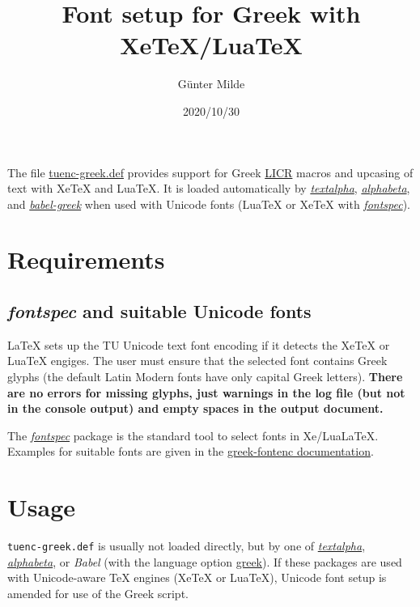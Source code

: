 \documentclass[a4paper]{article}
\begin{document}
\title{Font setup for Greek with XeTeX/LuaTeX}
\author{Günter Milde}
\date{2020/10/30}
\maketitle

\noindent The file \href{tuenc-greek.def.html}{tuenc-greek.def} provides
support for Greek \hyperref[licr]{LICR} macros and upcasing of text with
XeTeX and LuaTeX. It is loaded automatically by
\href{textalpha-doc.pdf}{\emph{textalpha}},
\href{alphabeta-doc.pdf}{\emph{alphabeta}}, and
\href{http://www.ctan.org/pkg/babel-greek}{\emph{babel-greek}} when used
with Unicode fonts (LuaTeX or XeTeX with
\href{http://www.ctan.org/pkg/fontspec}{\emph{fontspec}}).

\tableofcontents

\section{Requirements}

\subsection{\emph{fontspec} and suitable Unicode fonts}

LaTeX sets up the TU Unicode text font encoding if it detects the XeTeX or
LuaTeX engiges. The user must ensure that the selected font contains Greek
glyphs (the default Latin Modern fonts have only capital Greek letters).
\textbf{There are no errors for missing glyphs, just warnings in the log
file (but not in the console output) and empty spaces in the output
document.}

The \href{http://www.ctan.org/pkg/fontspec}{\emph{fontspec}} package is the
standard tool to select fonts in Xe/LuaLaTeX. Examples for suitable fonts
are given in the
\href{http://mirrors.ctan.org/language/greek/greek-fontenc/greek-fontenc.html#TU}
{greek-fontenc documentation}.


\section{Usage}

\texttt{tuenc-greek.def} is usually not loaded directly, but by one of
\href{textalpha-doc.pdf}{\emph{textalpha}},
\href{alphabeta-doc.pdf}{\emph{alphabeta}}, or \emph{Babel} (with the
language option \href{http://www.ctan.org/pkg/babel-greek}{greek}). If these
packages are used with Unicode-aware TeX engines (XeTeX or LuaTeX), Unicode
font setup is amended for use of the Greek script.
\end{document}
